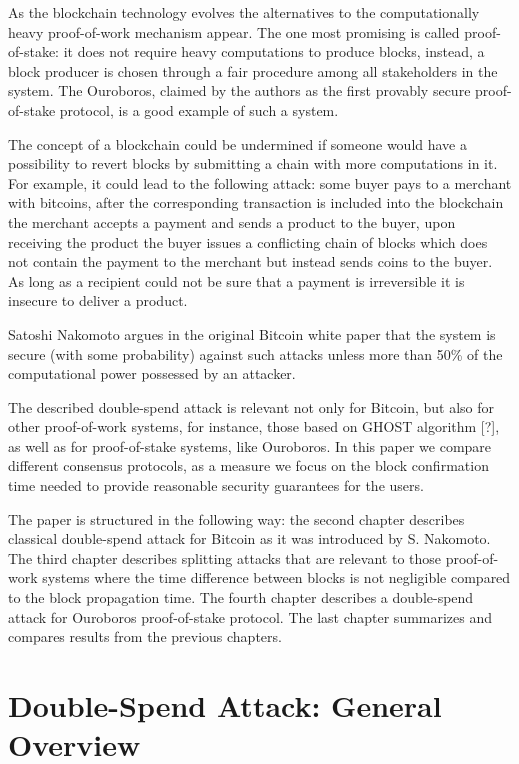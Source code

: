 \documentclass[10pt,a4paper]{article}
\numberwithin{equation}{section} %
\theoremstyle{plain}
\theoremstyle{definition}
\theoremstyle{remark}
\begin{document}
	As the blockchain technology evolves the alternatives to the computationally heavy proof-of-work mechanism appear. The one most promising is called proof-of-stake: it does not require heavy computations to produce blocks, instead, a block producer is chosen through a fair procedure among all stakeholders in the system. The Ouroboros, claimed by the authors as the first provably secure proof-of-stake protocol, is a good example of such a system.
	
	The concept of a blockchain could be undermined if someone would have a possibility to revert blocks by submitting a chain with more computations in it. For example, it could lead to the following attack: some buyer pays to a merchant with bitcoins, after the corresponding transaction is included into the blockchain the merchant accepts a payment and sends a product to the buyer, upon receiving the product the buyer issues a conflicting chain of blocks which does not contain the payment to the merchant but instead sends coins to the buyer. As long as a recipient could not be sure that a payment is irreversible it is insecure to deliver a product.
	
	Satoshi Nakomoto argues in the original Bitcoin white paper \cite{N08} that the system is secure (with some probability) against such attacks unless more than 50\% of the computational power possessed by an attacker.
	
	The described double-spend attack is relevant not only for Bitcoin, but also for other proof-of-work systems, for instance, those based on GHOST algorithm [?], as well as for proof-of-stake systems, like Ouroboros. In this paper we compare different consensus protocols, as a measure we focus on the block confirmation time needed to provide reasonable security guarantees for the users. 
	
	The paper is structured in the following way: the second chapter describes classical double-spend attack for Bitcoin as it was introduced by S. Nakomoto. The third chapter describes splitting attacks that are relevant to those proof-of-work systems where the time difference between blocks is not negligible compared to the block propagation time. The fourth chapter describes a double-spend attack for Ouroboros proof-of-stake protocol. The last chapter summarizes and compares results from the previous chapters. 
	 
	
	\section{Double-Spend Attack: General Overview} \label{double-spend-attack-general-overview}
	
\end{document}
